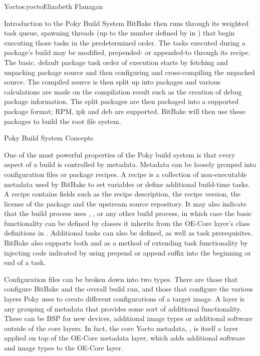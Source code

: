 \begin{aosachapter}{Yocto}{s:yocto}{Elizabeth Flanagan}
\begin{aosasect1}{Introduction to the Poky Build System}
BitBake then runs through its weighted task queue, spawning threads
(up to the number defined by  in
) that begin executing those tasks in the
predetermined order. The tasks executed during a package's build may
be modified, prepended- or appended-to through its recipe. The basic,
default package task order of execution starts by fetching and
unpacking package source and then configuring and cross-compiling the
unpacked source. The compiled source is then split up into packages
and various calculations are made on the compilation result such as
the creation of debug package information.  The split packages are
then packaged into a supported package format; RPM, ipk and deb 
are supported. BitBake will then use these packages to build
the root file system.

\begin{aosasect2}{Poky Build System Concepts}

One of the most powerful properties of the
Poky build system is that every aspect of a build is controlled by
metadata. Metadata can be loosely grouped into configuration files or
package recipes. A recipe is a
collection of non-executable
metadata used by BitBake to set variables or define additional 
build-time tasks. A recipe contains fields such as the recipe description,
the recipe version, the license of the package and the upstream
source repository. It may also indicate
that the build process uses , ,  or any
other build process, in which case the basic functionality can be
defined by classes it inherits from
the OE-Core layer's class definitions in .
Additional tasks can also be
defined, as well as task prerequisites. BitBake
also supports both 
and  as a method of extending task functionality by injecting
code indicated by using prepend or append suffix into the beginning
or end of a task.

Configuration files can be broken down into two types. There are those that
configure BitBake and the overall build run, and those that configure
the various layers Poky uses to create different configurations of a
target image. A layer is any grouping of metadata that provides some
sort of additional functionality. These can be BSP for new devices,
additional image types or additional software outside of the core
layers. In fact, the core Yocto metadata, , is itself a
layer applied on top of the OE-Core metadata layer,  which adds
additional software and image types to the OE-Core layer.


\end{aosasect2}
\end{aosasect1}
\end{aosachapter}
